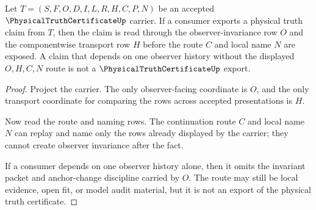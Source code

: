 \begin{theorem}
\label{thm:physical-truth-certificate-observer-invariance}
Let $T=(S,F,O,D,I,L,R,H,C,P,N)$ be an accepted $\PhysicalTruthCertificateUp$ carrier. If a consumer exports a physical truth claim from $T$, then the claim is read through the observer-invariance row $O$ and the componentwise transport row $H$ before the route $C$ and local name $N$ are exposed. A claim that depends on one observer history without the displayed $O,H,C,N$ route is not a $\PhysicalTruthCertificateUp$ export.
\end{theorem}
\begin{proof}
Project the carrier. The only observer-facing coordinate is $O$, and the only transport coordinate for comparing the rows across accepted presentations is $H$.

Now read the route and naming rows. The continuation route $C$ and local name $N$ can replay and name only the rows already displayed by the carrier; they cannot create observer invariance after the fact.

If a consumer depends on one observer history alone, then it omits the invariant packet and anchor-change discipline carried by $O$. The route may still be local evidence, open fit, or model audit material, but it is not an export of the physical truth certificate.
\end{proof}



